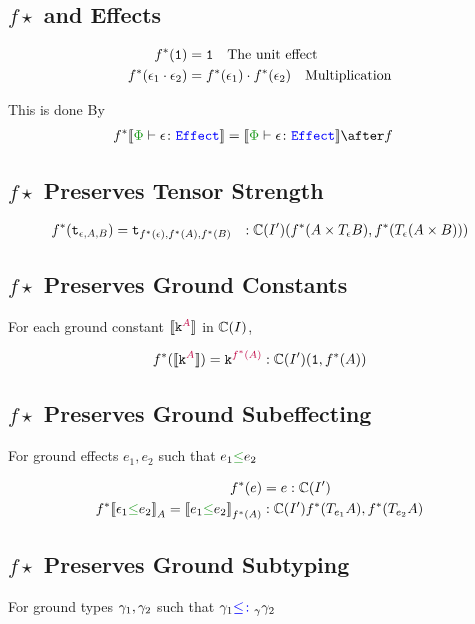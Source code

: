 \documentclass{report}
\begin{document}
\subsection{$f\star$ and Effects}
\begin{align*}
    f^*(\texttt{1}) &= \texttt{1} \quad\text{The unit effect}\\
    f^*(\epsilon_1\cdot\epsilon_2) &= f^*(\epsilon_1)\cdot f^*(\epsilon_2)\quad\text{Multiplication}\\
\end{align*}

This is done By
\begin{align*}
    f\star\deno{\typerelation{\P}{\e}{\effect}} & = \deno{\typerelation{\P}{\e}{\effect}}\after f
\end{align*}

\subsection{$f\star$ Preserves Tensor Strength}
\begin{align*}
    f^*(\texttt{t}_{\epsilon, A, B}) &= \texttt{t}_{f^*(\epsilon), f^*(A), f^*(B)} &: \mathbb{C}(I')(f^*(A\times T_{\epsilon}{B}), f^*(T_{\epsilon}{(A\times B)}))
\end{align*}
\subsection{$f\star$ Preserves Ground Constants}
For each ground constant ${\bf [\![}\texttt{k}^{\color{purple} A}{\bf ]\!]}$ in $\mathbb{C}(I)$,

\begin{align*}
    f^*({\bf [\![}\texttt{k}^{\color{purple} A}{\bf ]\!]}) = \texttt{k}^{\color{purple} f^*(A)} : \mathbb{C}(I')(\texttt{1}, f^*(A))
\end{align*}
\subsection{$f\star$ Preserves Ground Subeffecting}
For ground effects $e_1, e_2$ such that $e_1\subeffect e_2$



\begin{align*}
    f\star(e) & = e: \C(I')\\
    f\star\db{\e_1\subeffect e_2}_A = \db{e_1 \subeffect e_2}_{f\star(A)} &:\C(I'){f\star(\T{e_1}{A}), f\star(\T{e_2}{A})} \\
\end{align*}
\subsection{$f\star$ Preserves Ground Subtyping}
For ground types $\gamma_1, \gamma_2$ such that $\gamma_1{\color{blue} \leq\colon}_\gamma\gamma_2$
\end{document}
